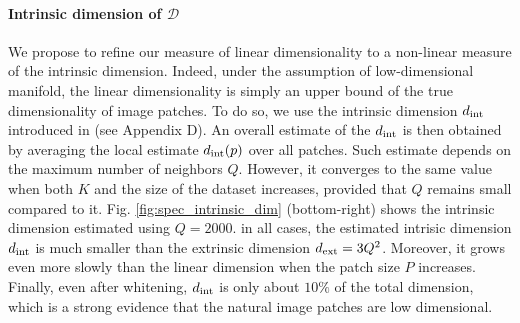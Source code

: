 \documentclass{article} %
\begin{document}
\paragraph{Intrinsic dimension of  $\mathcal{D}$}
We propose to refine our measure of linear dimensionality to a non-linear measure of the intrinsic dimension. Indeed, under the assumption of low-dimensional manifold, the linear dimensionality is simply an upper bound of the true dimensionality of image patches.
To do so, we use the intrinsic dimension $d_{\rm int}$ introduced in \citep{Levina:2004} (see Appendix D).  
An overall estimate of the $d_{\rm int}$ is then obtained by averaging the local estimate $d_{\rm int}(p)$ over all patches. Such estimate depends on the maximum number of neighbors $Q$. However, it converges to the same value when both $K$ and the size of the dataset  increases, provided that $Q$ remains small compared to it. Fig. \ref{fig:spec_intrinsic_dim} (bottom-right) shows the intrinsic dimension estimated using $Q=2000$.
in all cases, the estimated intrisic dimension $d_{\rm int}$ is much smaller than the extrinsic dimension $d_{\rm ext}=3Q^2$.
Moreover, it grows even more slowly than the linear dimension when the patch size $P$ increases. Finally, even after whitening, $d_{\rm int}$ is only about $10\%$ of the total dimension, which is a strong evidence that the natural image patches are low dimensional.
\end{document}

